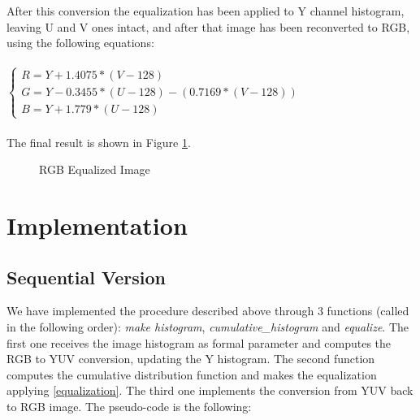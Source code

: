 \documentclass[10pt,twocolumn,letterpaper]{article}
\begin{document}
After this conversion the equalization has been applied to Y channel histogram, leaving U and V ones intact, and after that image has been reconverted to RGB, using the following equations:\\
\\
$\begin{cases} 
R = Y + 1.4075 * (V - 128)\\
G = Y - 0.3455 * (U - 128) - (0.7169 * (V - 128))\\
B = Y + 1.779 * (U - 128)
\end{cases}$\\
\\
The final result is shown in Figure \ref{fig:RGB_eq}.

\begin{figure}[h]
	\centering
	\qquad
	\caption{RGB Equalized Image}
	\label{fig:RGB_eq}
\end{figure}

\section{Implementation}
\subsection{Sequential Version}
We have implemented the procedure described above through 3 functions (called in the following order): \textit{make histogram}, \textit{cumulative\_histogram} and \textit{equalize}.
The first one receives the image histogram as formal parameter and computes the RGB to YUV conversion, updating the Y histogram. The second function computes the cumulative distribution function and makes the equalization applying \ref{equalization}. The third one implements the conversion from YUV back to RGB image. The pseudo-code is the following:
\end{document}
